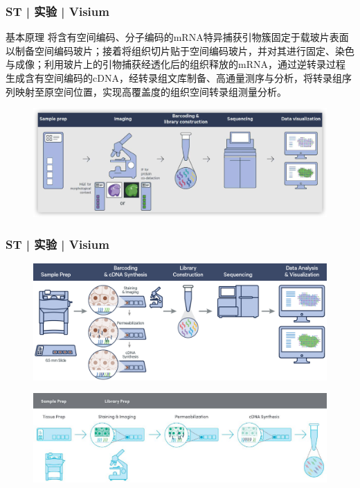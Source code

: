 \documentclass[11pt]{ctexbeamer}
\begin{document}
\begin{frame}
	\frametitle{ST | 实验 | Visium}
		\begin{block}{基本原理}
			将含有空间编码、分子编码的mRNA特异捕获引物簇固定于载玻片表面以制备空间编码玻片；接着将组织切片贴于空间编码玻片，并对其进行固定、染色与成像；利用玻片上的引物捕获经透化后的组织释放的mRNA，通过逆转录过程生成含有空间编码的cDNA，经转录组文库制备、高通量测序与分析，将转录组序列映射至原空间位置，实现高覆盖度的组织空间转录组测量分析。
	\end{block}
\vspace{-0.6em}
		\begin{figure}
	\includegraphics[width=\textwidth]{ST_workflow_08.png}
\end{figure}
\end{frame}

\begin{frame}
	\frametitle{ST | 实验 | Visium}
		\begin{figure}
		\includegraphics[width=\textwidth]{ST_workflow_04.png}
	\end{figure}
\vspace{-0.5em}
	\begin{figure}
		\includegraphics[width=\textwidth]{ST_workflow_06.png}
	\end{figure}
\end{frame}
\end{document}
